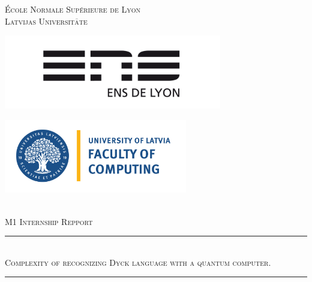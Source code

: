 \documentclass[11pt,a4paper]{article}
\newcommand{\HRule}{\rule{\linewidth}{0.5mm}}
\theoremstyle{definition}
\theoremstyle{plain}
\theoremstyle{definition}
\begin{document}
\begin{titlepage}
    \begin{sffamily}
        \begin{center}

            \textsc{\LARGE École Normale Supérieure de Lyon}\\[0.5cm]
            \textsc{\LARGE Latvijas Universit$\overline{\textrm{a}}$te} \\[1cm]

            \begin{minipage}[c]{.46\linewidth}
                \hspace{-2cm}
                \includegraphics[width=9.5cm]{illustration/Logo_ENS_Lyon.png}
            \end{minipage}
            \hfill%
            \begin{minipage}[c]{.46\linewidth}
                \centering
                \includegraphics[width=8cm]{illustration/Faculty_of_Computing_University_of_Latvia-1536x619-1.png}
            \end{minipage}\\[2cm]

            \textsc{\Large M1 Internship Repport}\\[2cm]

            \HRule \\[0.4cm]
            \textsc{\huge Complexity of recognizing Dyck language with a quantum computer.}
            \HRule \\[2cm]

            \vfill


\end{center}
\end{sffamily}
\end{titlepage}
\end{document}
